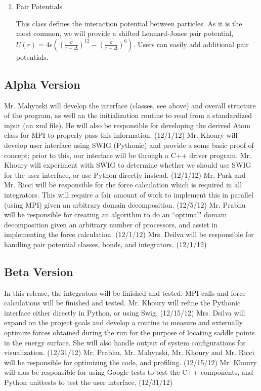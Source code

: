 \documentclass[10pt]{article}
\begin{document}
\begin{enumerate}
	\item{Pair Potentials} \par This class defines the interaction potential between particles. As it is the most common, we will provide a shifted Lennard-Jones pair potential, $U(r) = 4\epsilon \left( \left( \frac{\sigma}{r-\Delta} \right)^{12} - \left( \frac{\sigma}{r - \Delta} \right)^{6} \right)$. Users can easily add additional pair potentials.
\end{enumerate}

\subsection{Alpha Version}
Mr. Mahynski will develop the interface (classes, see above) and overall structure of the program, as well an the initialization routine to read from a standardized input (an xml file).  He will also be responsible for developing the derived Atom class for MPI to properly pass this information. (12/1/12)
Mr. Khoury will develop user interface using SWIG (Pythonic) and provide a some basic proof of concept; prior to this, our interface will be through a C++ driver program. Mr. Khoury will experiment with SWIG to determine whether we should use SWIG for the user interface, or use Python directly instead. (12/1/12)
Mr. Park and Mr. Ricci will be responsible for the force calculation which is required in all integrators.  This will require a fair amount of work to implement this in parallel (using MPI) given an arbitrary domain decomposition. (12/5/12)
Mr. Prabhu will be responsible for creating an algorithm to do an ``optimal" domain decomposition given an arbitrary number of processors, and assist in implementing the force calculation.  (12/1/12)
Mrs. Dsilva will be responsible for handling pair potential classes, bonds, and integrators.  (12/1/12)

\subsection{Beta Version}
In this release, the integrators will be finished and tested.  MPI calls and force calculations will be finished and tested.
Mr. Khoury will refine the Pythonic interface either directly in Python, or using Swig.  (12/15/12)
Mrs. Dsilva will expand on the project goals and develop a routine to measure and externally optimize forces obtained during the run for the purpose of locating saddle points in the energy surface.  She will also handle output of system configurations for visualization.  (12/31/12)
Mr. Prabhu, Mr. Mahynski, Mr. Khoury and Mr. Ricci will  be responsible for optimizing the code, and profiling. (12/15/12)
Mr. Khoury will alos be responsible for using Google tests to test the C++ components, and Python unittests to test the user interface. (12/31/12)
\end{document}
